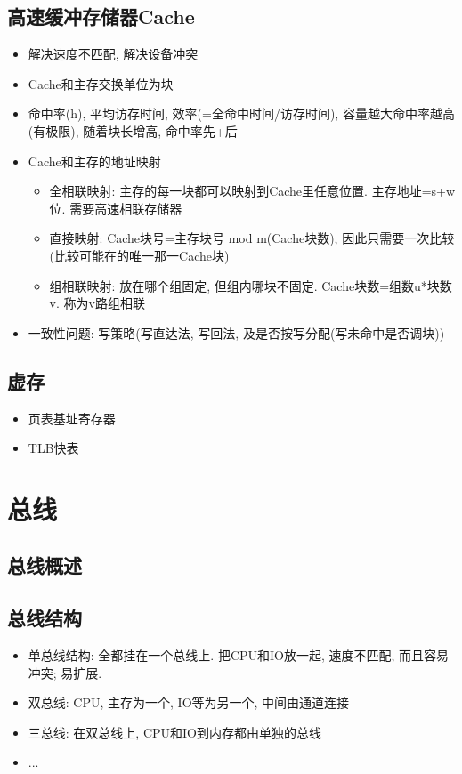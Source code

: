 \documentclass[UTF8]{article}
\begin{document}
\subsection{高速缓冲存储器Cache}
\begin{itemize}
\item 解决速度不匹配, 解决设备冲突
\item Cache和主存交换单位为块
\item 命中率(h), 平均访存时间, 效率(=全命中时间/访存时间), 容量越大命中率越高(有极限), 随着块长增高, 命中率先+后-
\item Cache和主存的地址映射
	\begin{itemize}
	\item 全相联映射: 主存的每一块都可以映射到Cache里任意位置. 主存地址=s+w位. 需要高速相联存储器
	\item 直接映射: Cache块号=主存块号 mod m(Cache块数), 因此只需要一次比较(比较可能在的唯一那一Cache块)
	\item 组相联映射: 放在哪个组固定, 但组内哪块不固定. Cache块数=组数u*块数v. 称为v路组相联
	\end{itemize}
\item 一致性问题: 写策略(写直达法, 写回法, 及是否按写分配(写未命中是否调块))
\end{itemize}
\subsection{虚存}
\begin{itemize}
\item 页表基址寄存器
\item TLB快表
\end{itemize}

\section{总线}
\subsection{总线概述}
\subsection{总线结构}
\begin{itemize}
\item 单总线结构: 全都挂在一个总线上. 把CPU和IO放一起, 速度不匹配, 而且容易冲突; 易扩展.
\item 双总线: CPU, 主存为一个, IO等为另一个, 中间由通道连接
\item 三总线: 在双总线上, CPU和IO到内存都由单独的总线
\item ...
\end{itemize}
\end{document}
